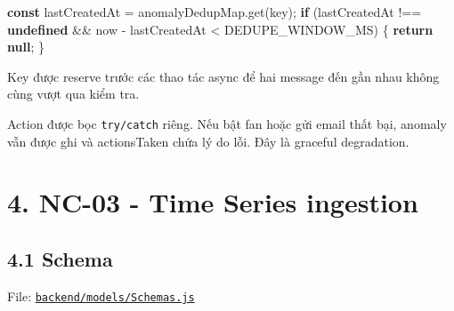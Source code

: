 \documentclass[11pt,oneside,openany]{book}
\renewcommand{\texttt}[1]{{\ttfamily\small #1}}
\newenvironment{Shaded}{\begin{snugshade}}{\end{snugshade}}
\newcommand{\ControlFlowTok}[1]{\textcolor[rgb]{0.99,0.74,0.29}{\textbf{#1}}}
\newcommand{\FunctionTok}[1]{\textcolor[rgb]{0.56,0.27,0.68}{#1}}
\newcommand{\KeywordTok}[1]{\textcolor[rgb]{0.81,0.81,0.76}{\textbf{#1}}}
\newcommand{\NormalTok}[1]{\textcolor[rgb]{0.81,0.81,0.76}{#1}}
\newcommand{\OperatorTok}[1]{\textcolor[rgb]{0.81,0.81,0.76}{#1}}
\renewenvironment{Shaded}{%
  \def\FrameCommand{\fboxsep=8pt\colorbox{shadecolor}}%
  \MakeFramed{\advance\hsize-\width\FrameRestore}%
}{\endMakeFramed}
\begin{document}
\begin{Shaded}
\begin{Highlighting}[]
\KeywordTok{const}\NormalTok{ lastCreatedAt }\OperatorTok{=}\NormalTok{ anomalyDedupMap}\OperatorTok{.}\FunctionTok{get}\NormalTok{(key)}\OperatorTok{;}
\ControlFlowTok{if}\NormalTok{ (lastCreatedAt }\OperatorTok{!==} \KeywordTok{undefined} \OperatorTok{\&\&}\NormalTok{ now }\OperatorTok{{-}}\NormalTok{ lastCreatedAt }\OperatorTok{\textless{}}\NormalTok{ DEDUPE\_WINDOW\_MS) \{}
  \ControlFlowTok{return} \KeywordTok{null}\OperatorTok{;}
\NormalTok{\}}
\end{Highlighting}
\end{Shaded}

Key được reserve trước các thao tác async để hai message đến gần nhau
không cùng vượt qua kiểm tra.

Action được bọc \nolinkurl{try/catch} riêng. Nếu bật fan hoặc gửi email
thất bại, anomaly vẫn được ghi và \texttt{actionsTaken} chứa lý do lỗi.
Đây là graceful degradation.

\section{4. NC-03 - Time Series
ingestion}\label{4-nc-03---time-series-ingestion}

\subsection{4.1 Schema}\label{41-schema}

File:
\href{../backend/models/Schemas.js}{\nolinkurl{backend/models/Schemas.js}}
\end{document}
